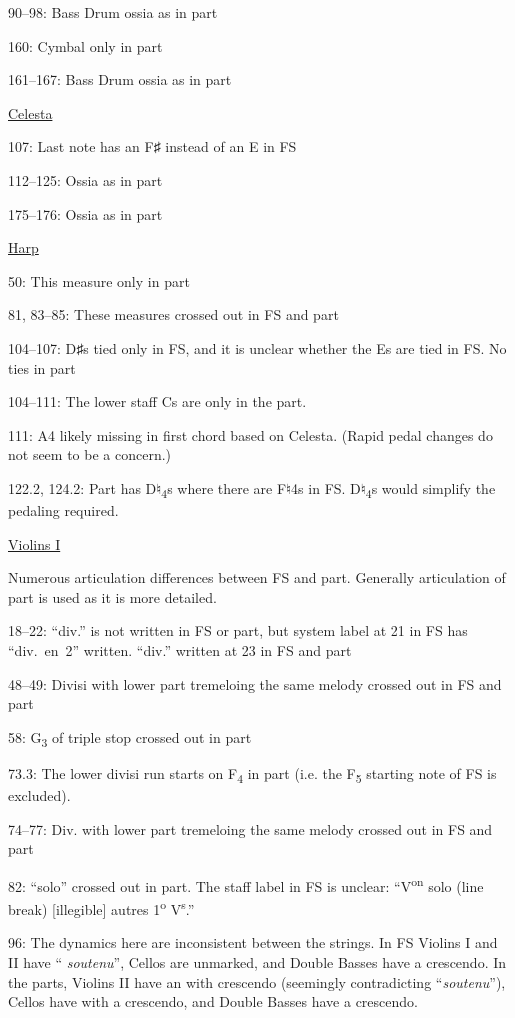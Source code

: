 \documentclass[twoside]{article}
\newcommand\dynmark[1]{\scalebox{0.9}{#1}{\kern1pt}}
\begin{document}
\begin{hangparas}{15pt}{1}
\begin{multicols}{2}
90--98: Bass Drum ossia as in part

160: Cymbal only in part

161--167: Bass Drum ossia as in part

\underline{Celesta}

107: Last note has an F♯ instead of an E in FS

112--125: Ossia as in part

175--176: Ossia as in part

\columnbreak

\underline{Harp}

50: This measure only in part

81, 83--85: These measures crossed out in FS and part

104--107: D♯s tied only in FS, and it is unclear whether the Es are tied in FS. No ties in part

104--111: The lower staff Cs are only in the part.

111: A4 likely missing in first chord based on Celesta. (Rapid pedal changes do not seem to be a concern.)

122.2, 124.2: Part has D♮\textsubscript{4}s where there are F♮4s in FS. D♮\textsubscript{4}s would simplify the pedaling required.

\underline{Violins I}

Numerous articulation differences between FS and part. Generally articulation of part is used as it is more detailed.

18--22: ``div.'' is not written in FS or part, but system label at 21 in FS has \mbox{``div. en 2''} written. ``div.'' written at 23 in FS and part

48--49: Divisi with lower part tremeloing the same melody crossed out in FS and part

58: G\textsubscript{3} of triple stop crossed out in part

73.3: The lower divisi run starts on F\textsubscript{4} in part (i.e. the F\textsubscript{5} starting note of FS is excluded).

74--77: Div. with lower part tremeloing the same melody crossed out in FS and part

82: ``solo'' crossed out in part. The staff label in FS is unclear: ``V\textsuperscript{on} solo (line break) [illegible] autres 1\textsuperscript{o} V\textsuperscript{s}.''

96: The dynamics here are inconsistent between the strings. In FS Violins I and II have ``\dynmark{\sF} \textit{soutenu}'', Cellos are unmarked, and Double Basses have a crescendo. In the parts, Violins II have an \dynmark{\sF}\dynmark{\p} with crescendo (seemingly contradicting ``\textit{soutenu}''), Cellos have \dynmark{\p} with a crescendo, and Double Basses have a crescendo.


\end{multicols}
\end{hangparas}
\end{document}
